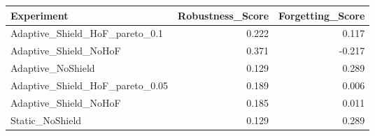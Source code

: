 \begin{tabular}{lrr}
\toprule
Experiment & Robustness_Score & Forgetting_Score \\
\midrule
Adaptive_Shield_HoF_pareto_0.1 & 0.222 & 0.117 \\
Adaptive_Shield_NoHoF & 0.371 & -0.217 \\
Adaptive_NoShield & 0.129 & 0.289 \\
Adaptive_Shield_HoF_pareto_0.05 & 0.189 & 0.006 \\
Adaptive_Shield_NoHoF & 0.185 & 0.011 \\
Static_NoShield & 0.129 & 0.289 \\
\bottomrule
\end{tabular}
